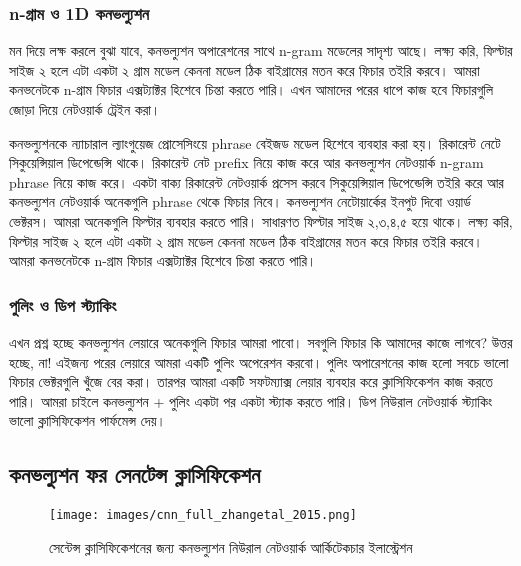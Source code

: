 \documentclass{book}
\begin{document}
\subsubsection{n-গ্রাম ও 1D কনভল্যুশন}
মন দিয়ে লক্ষ করলে বুঝা যাবে, কনভল্যুশন অপারেশনের সাথে n-gram মডেলের সাদৃশ্য আছে। 
লক্ষ্য করি, ফিল্টার সাইজ ২ হলে এটা একটা ২ গ্রাম মডেল কেননা মডেল ঠিক বাইগ্রামের মতন করে ফিচার তইরি করবে। 
আমরা কনভনেটকে n-গ্রাম ফিচার এক্সট্যাক্টর হিশেবে চিন্তা করতে পারি। এখন আমাদের পরের ধাপে কাজ হবে ফিচারগুলি জোড়া দিয়ে নেটওয়ার্ক ট্রেইন করা।

কনভল্যুশনকে ন্যাচারাল ল্যাংগুয়েজ প্রোসেসিংয়ে phrase বেইজড মডেল হিশেবে ব্যবহার করা হয়। রিকারেন্ট নেটে সিকুয়েন্সিয়াল ডিপেন্ডেন্সি থাকে। 
রিকারেন্ট নেট prefix নিয়ে কাজ করে আর কনভল্যুশন নেটওয়ার্ক n-gram phrase নিয়ে কাজ করে।
একটা বাক্য রিকারেন্ট নেটওয়ার্ক প্রসেস করবে সিকুয়েন্সিয়াল ডিপেন্ডেন্সি তইরি করে আর কনভল্যুশন নেটওয়ার্ক অনেকগুলি phrase থেকে ফিচার নিবে। 
কনভল্যুশন নেটোয়ার্কের ইনপুট দিবো ওয়ার্ড ভেক্টরস। আমরা অনেকগুলি ফিল্টার ব্যবহার করতে পারি। সাধারণত ফিল্টার সাইজ ২,৩,৪,৫ হয়ে থাকে। 
লক্ষ্য করি, ফিল্টার সাইজ ২ হলে এটা একটা ২ গ্রাম মডেল কেননা মডেল ঠিক বাইগ্রামের মতন করে ফিচার তইরি করবে। 
আমরা কনভনেটকে n-গ্রাম ফিচার এক্সট্যাক্টর হিশেবে চিন্তা করতে পারি। 

\subsubsection{পুলিং ও ডিপ স্ট্যাকিং}
এখন প্রশ্ন হচ্ছে কনভল্যুশন লেয়ারে অনেকগুলি ফিচার আমরা পাবো। সবগুলি ফিচার কি আমাদের কাজে লাগবে? 
উত্তর হচ্ছে, না! এইজন্য পরের লেয়ারে আমরা একটি পুলিং অপেরেশন করবো। পুলিং অপারেশনের কাজ হলো সবচে ভালো ফিচার ভেক্টরগুলি খুঁজে বের করা। 
তারপর আমরা একটি সফটম্যাক্স লেয়ার ব্যবহার করে ক্লাসিফিকেশন কাজ করতে পারি। আমরা চাইলে কনভল্যুশন + পুলিং একটা পর একটা স্ট্যাক করতে পারি। 
ডিপ নিউরাল নেটওয়ার্ক স্ট্যাকিং ভালো ক্লাসিফিকেশন পার্ফমেন্স দেয়।

\subsection{কনভল্যুশন ফর সেনটেন্স ক্লাসিফিকেশন}

\begin{figure}[htbp] %
   \centering
   \texttt{[image: images/cnn\_full\_zhangetal\_2015.png]} 
   \caption{সেন্টেন্স ক্লাসিফিকেশনের জন্য কনভল্যুশন নিউরাল নেটওয়ার্ক আর্কিটেকচার ইলাস্ট্রেশন}
   \label{fig:cnn_zhangetal} 
\end{figure} 
\end{document}
